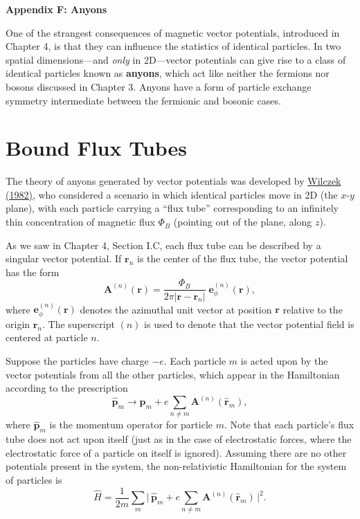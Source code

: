 \documentclass[pra,12pt]{revtex4}
\begin{document}
\begin{center}
{\large \textbf{Appendix F: Anyons}}
\end{center}

One of the strangest consequences of magnetic vector potentials,
introduced in Chapter 4, is that they can influence the statistics of
identical particles.  In two spatial dimensions---and \textit{only} in
2D---vector potentials can give rise to a class of identical particles
known as \textbf{anyons}, which act like neither the fermions nor
bosons discussed in Chapter 3.  Anyons have a form of particle
exchange symmetry intermediate between the fermionic and
bosonic cases.

\section{Bound Flux Tubes}

The theory of anyons generated by vector potentials was developed by
\hyperref[cite:wilczek]{Wilczek (1982)}, who considered a scenario in
which identical particles move in 2D (the $x$-$y$ plane), with each
particle carrying a ``flux tube'' corresponding to an infinitely thin
concentration of magnetic flux $\Phi_B$ (pointing out of the plane,
along $z$).

As we saw in Chapter 4, Section I.C, each flux tube can be described
by a singular vector potential.  If $\mathbf{r}_n$ is the center of
the flux tube, the vector potential has the form
\begin{equation}
  \mathbf{A}^{(n)}(\mathbf{r}) = \frac{\Phi_B}{2\pi
    |\mathbf{r}-\mathbf{r}_n|} \; \mathbf{e}_\phi^{(n)}(\mathbf{r}),
  \label{Asolenoid}
\end{equation}
where $\mathbf{e}_\phi^{(n)}(\mathbf{r})$ denotes the azimuthal unit
vector at position $\mathbf{r}$ relative to the origin $\mathbf{r}_n$.
The superscript $(n)$ is used to denote that the vector potential
field is centered at particle $n$.

Suppose the particles have charge $-e$.  Each particle $m$ is acted
upon by the vector potentials from all the other particles, which
appear in the Hamiltonian according to the prescription
\begin{equation}
  \hat{\mathbf{p}}_m \rightarrow \hat{\mathbf{p}}_m
  + e \sum_{n \ne m} \mathbf{A}^{(n)}(\hat{\mathbf{r}}_m),
\end{equation}
where $\hat{\mathbf{p}}_m$ is the momentum operator for particle $m$.
Note that each particle's flux tube does not act upon itself (just as
in the case of electrostatic forces, where the electrostatic force of
a particle on itself is ignored).  Assuming there are no other
potentials present in the system, the non-relativistic Hamiltonian for
the system of particles is
\begin{equation}
  \hat{H} = \frac{1}{2m} \sum_m \Big| \,\hat{\mathbf{p}}_m
  + e \sum_{n \ne m} \mathbf{A}^{(n)}(\hat{\mathbf{r}}_m)\,\Big|^2.
\end{equation}
\end{document}
